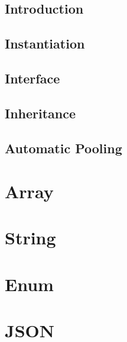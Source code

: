 \documentclass[12pt,letterpaper]{report}
\begin{document}
\subsection{Introduction}\label{Introduction}
\subsection{Instantiation}\label{Instantiation}
\subsection{Interface}\label{Interface}
\subsection{Inheritance}\label{Inheritance}
\subsection{Automatic Pooling}\label{Automatic Pooling}
\section{Array}\label{Array}
\section{String}\label{String}
\section{Enum}\label{Enum}
\section{JSON}\label{JSON}
\end{document}
